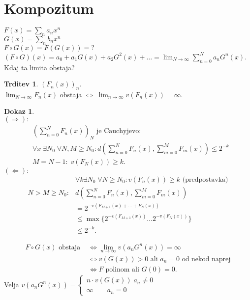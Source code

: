 \documentclass[a4paper, 12pt]{book}
\theoremstyle{definition}
\newtheorem{claim}[counter]{Trditev}
\newtheorem{pro}[counter]{Dokaz}
\theoremstyle{remark}
\begin{document}
\section{Kompozitum}

$F(x) = \sum_n a_n x^n$ \\
$G(x) = \sum_n b_n x^n$ \\
$F \circ G(x) = F(G(x)) = ?$ \\
$(F \circ G)(x) = a_0 + a_1 G(x) + a_2 G^2(x) + \dots = \lim_{N \to \infty} \sum_{n=0}^{N} a_n G^n(x)$. \\
Kdaj ta limita obstaja?
\begin{claim}
  $(F_n(x))_n$. \\
  $\lim_{N \to \infty} F_n(x)$ obstaja $\iff \; \lim_{n \to \infty} v\left(F_n(x)\right) = \infty$.
\end{claim}
\begin{pro} \text{} \\
  $(\Longrightarrow):$
  \begin{align*}
    &\left(\sum_{n=0}^{N} F_n(x)\right)_N \text{ je Cauchyjevo}: \\
    &\forall x \; \exists N_0 \; \forall N,M \geq N_0: d\left(\sum_{n=0}^{N} F_n(x), \sum_{m=0}^{M} F_m(x)\right) \leq 2^{-k} \\
    &M = N-1: \; v\left(F_N(x)\right) \geq k.
  \end{align*}
  $(\Longleftarrow):$
  \begin{align*}
    &\forall k \exists N_0 \; \forall N \geq N_0: v\left(F_n(x)\right) \geq k \text{ (predpostavka)} \\
    N > M \geq N_0: &d\left(\sum_{n=0}^{N} F_n(x), \sum_{m=0}^{M} F_m(x)\right) \\
    &= 2^{-v(F_{M+1}(x) + \dots + F_N(x))} \\
    &\leq \max \{2^{-v(F_{M+1}(x))} \dots 2^{-v(F_N(x))}\} \\
    &\leq 2^{-k}.
  \end{align*}
\end{pro}
\begin{align*}
  F \circ G(x) \text{ obstaja } &\iff \lim_{n \to \infty} v\left(a_n G^n(x)\right) = \infty \\
  &\iff v(G(x)) > 0 \text{ ali } a_n = 0 \text{ od nekod naprej} \\
  &\iff F \text{ polinom ali } G(0) = 0.
\end{align*}
Velja $v\left(a_n G^n(x)\right) = \begin{cases}
  n \cdot v(G(x)) \; a_n \neq 0 \\
  \infty \qquad a_n = 0
\end{cases}$
\end{document}
